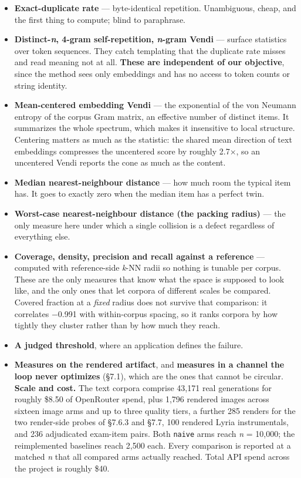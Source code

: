 \documentclass[
  10pt,
]{article}
\providecommand{\tightlist}{%
  \setlength{\itemsep}{0pt}\setlength{\parskip}{0pt}}
\theoremstyle{plain}
\theoremstyle{definition}
\providecommand{\tightlist}{\setlength{\itemsep}{0pt}\setlength{\parskip}{0pt}}
\begin{document}
\begin{itemize}
\tightlist
\item
  \textbf{Exact-duplicate rate} --- byte-identical repetition.
  Unambiguous, cheap, and the first thing to compute; blind to
  paraphrase.
\item
  \textbf{Distinct-\emph{n}, 4-gram self-repetition, \emph{n}-gram
  Vendi} --- surface statistics over token sequences. They catch
  templating that the duplicate rate misses and read meaning not at all.
  \textbf{These are independent of our objective}, since the method sees
  only embeddings and has no access to token counts or string identity.
\item
  \textbf{Mean-centered embedding Vendi} --- the exponential of the von
  Neumann entropy of the corpus Gram matrix, an effective number of
  distinct items. It summarizes the whole spectrum, which makes it
  insensitive to local structure. Centering matters as much as the
  statistic: the shared mean direction of text embeddings compresses the
  uncentered score by roughly 2.7×, so an uncentered Vendi reports the
  cone as much as the content.
\item
  \textbf{Median nearest-neighbour distance} --- how much room the
  typical item has. It goes to exactly zero when the median item has a
  perfect twin.
\item
  \textbf{Worst-case nearest-neighbour distance (the packing radius)}
  --- the only measure here under which a single collision is a defect
  regardless of everything else.
\item
  \textbf{Coverage, density, precision and recall against a reference}
  --- computed with reference-side \emph{k}-NN radii so nothing is
  tunable per corpus. These are the only measures that know what the
  space is supposed to look like, and the only ones that let corpora of
  different scales be compared. Covered fraction at a \emph{fixed}
  radius does not survive that comparison: it correlates −0.991 with
  within-corpus spacing, so it ranks corpora by how tightly they cluster
  rather than by how much they reach.
\item
  \textbf{A judged threshold}, where an application defines the failure.
\item
  \textbf{Measures on the rendered artifact}, and \textbf{measures in a
  channel the loop never optimizes} (§7.1), which are the ones that
  cannot be circular. \textbf{Scale and cost.} The text corpora comprise
  43,171 real generations for roughly \$8.50 of OpenRouter spend, plus
  1,796 rendered images across sixteen image arms and up to three
  quality tiers, a further 285 renders for the two render-side probes of
  §7.6.3 and §7.7, 100 rendered Lyria instrumentals, and 236 adjudicated
  exam-item pairs. Both \texttt{naive} arms reach \emph{n} = 10,000; the
  reimplemented baselines reach 2,500 each. Every comparison is reported
  at a matched \emph{n} that all compared arms actually reached. Total
  API spend across the project is roughly \$40.
\end{itemize}
\end{document}
